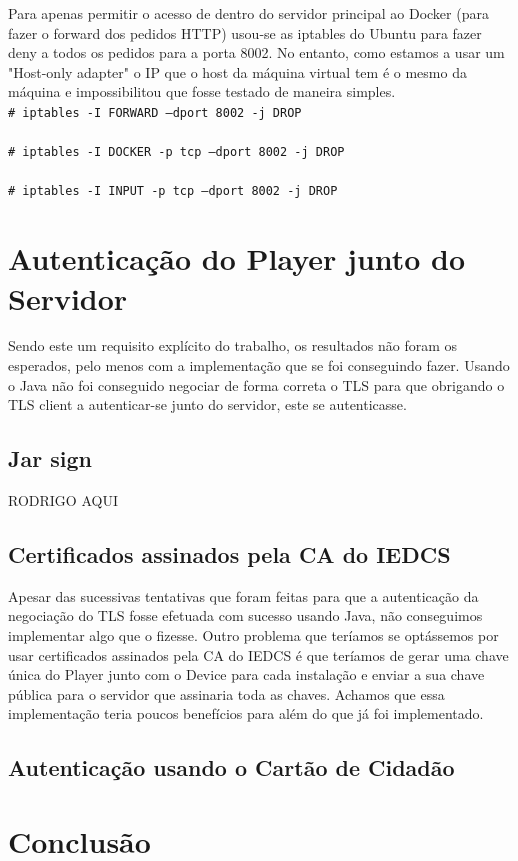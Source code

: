 \documentclass[pdftex,12pt,a4paper]{report}
\newcommand{\shellcmd}[1]{\\\indent\indent\texttt{\footnotesize\# #1}\\}
\begin{document}
Para apenas permitir o acesso de dentro do servidor principal ao Docker (para fazer o forward dos pedidos HTTP) usou-se as iptables do Ubuntu para fazer deny a todos os pedidos para a porta 8002. No entanto, como estamos a usar um "Host-only adapter" o IP que o host da máquina virtual tem é o mesmo da máquina e impossibilitou que fosse testado de maneira simples.
\shellcmd{iptables -I FORWARD  --dport 8002 -j DROP}
\shellcmd{iptables -I DOCKER -p tcp --dport 8002 -j DROP}
\shellcmd{iptables -I INPUT -p tcp --dport 8002 -j DROP}

\section{Autenticação do Player junto do Servidor}

Sendo este um requisito explícito do trabalho, os resultados não foram os esperados, pelo menos com a implementação que se foi conseguindo fazer. Usando o Java não foi conseguido negociar de forma correta o TLS para que obrigando o TLS client a autenticar-se junto do servidor, este se autenticasse.

\subsection{Jar sign}
RODRIGO AQUI

\subsection{Certificados assinados pela CA do IEDCS}
Apesar das sucessivas tentativas que foram feitas para que a autenticação da negociação do TLS fosse efetuada com sucesso usando Java, não conseguimos implementar algo que o fizesse. Outro problema que teríamos se optássemos por usar certificados assinados pela CA do IEDCS é que teríamos de gerar uma chave única do Player junto com o Device para cada instalação e enviar a sua chave pública para o servidor que assinaria toda as chaves. Achamos que essa implementação teria poucos benefícios para além do que já foi implementado.

\subsection{Autenticação usando o Cartão de Cidadão}

\newpage
\section{Conclusão}
\end{document}

